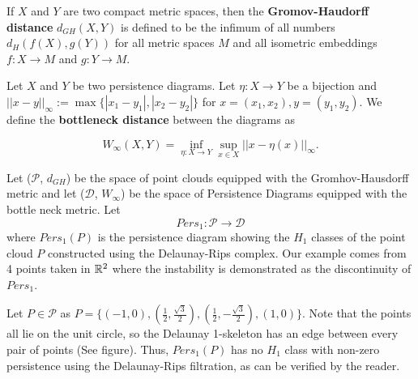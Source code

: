 \documentclass[letterpaper,titlepage]{article}
\begin{document}
\begin{defn}
    If $X$ and $Y$ are two compact metric spaces, then the \textbf{Gromov-Haudorff distance} $d_{GH}(X,Y)$ is defined to be the infimum of all numbers $d_H(f(X),g(Y))$ for all metric spaces $M$ and all isometric embeddings $f:X \to M$ and $g:Y \to M$.
\end{defn}

\begin{defn}
    Let $X$ and $Y$ be two persistence diagrams. Let $\eta:X\to Y$ be a bijection and $||x-y||_\infty := \max \{|x_1-y_1|,|x_2-y_2|\}$ for $x=(x_1,x_2), y=(y_1,y_2)$. We define the \textbf{bottleneck distance} between the diagrams as

    $$W_\infty(X,Y) = \inf_{\eta:X\to Y} \sup_{x\in X}||x-\eta(x)||_\infty.$$    
\end{defn}

Let ($\mathcal{P}$, $d_{GH}$) be the space of point clouds equipped with the Gromhov-Hausdorff metric and let ($\mathcal{D}$, $W_\infty$) be the space of Persistence Diagrams equipped with the bottle neck metric. Let
$$Pers_1: \mathcal{P} \to \mathcal{D}$$
where $Pers_1(P)$ is the persistence diagram showing the $H_1$ classes of the point cloud $P$ constructed using the Delaunay-Rips complex. Our example comes from 4 points taken in $\mathbb{R}^2$ where the instability is demonstrated as the discontinuity of $Pers_1$.

Let $P \in \mathcal{P}$ as $P = \{(-1,0),(\frac{1}{2},\frac{\sqrt{3}}{2}),(\frac{1}{2},-\frac{\sqrt{3}}{2}),(1,0)\}.$ Note that the points all lie on the unit circle, so the Delaunay 1-skeleton has an edge between every pair of points (See figure). Thus, $Pers_1(P)$ has no $H_1$ class with non-zero persistence using the Delaunay-Rips filtration, as can be verified by the reader.
\end{document}

